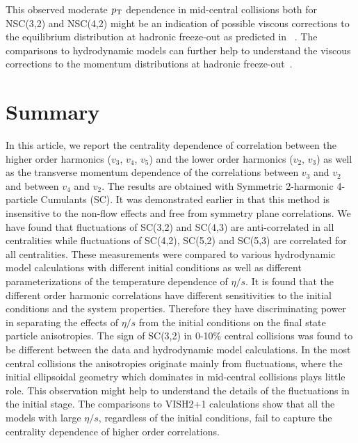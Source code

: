 This observed moderate $p_{\rm T}$ dependence in mid-central collisions both for NSC(3,2) and NSC(4,2) might be an indication of possible viscous corrections to the equilibrium distribution at hadronic freeze-out as predicted in ~\cite{Luzum:2010ad}.
The comparisons to hydrodynamic models can further help to understand the viscous corrections to the momentum distributions at hadronic freeze-out~\cite{Dusling:2009df,Teaney:2012ke,Molnar:2014fva,Niemi:2015qia}.


 
\section{Summary}
\label{sec:summary}
In this article, we report the centrality dependence of correlation between the higher order harmonics ($v_3$, $v_4$, $v_5$) and the lower order harmonics ($v_2$, $v_3$) as well as the transverse momentum dependence of the correlations between $v_3$ and $v_2$ and between $v_4$ and $v_2$.
The results are obtained with Symmetric 2-harmonic 4-particle Cumulants (SC). It was demonstrated earlier in \cite{ALICE:2016kpq} that this method is insensitive to the non-flow effects and free from symmetry plane correlations.
We have found that fluctuations of SC(3,2) and SC(4,3) are anti-correlated in all centralities while fluctuations of SC(4,2), SC(5,2) and SC(5,3) are correlated for all centralities. 
These measurements were compared to various hydrodynamic model calculations with different initial conditions as well as different parameterizations of the temperature dependence of $\eta/s$.
It is found that the different order harmonic correlations have different sensitivities to the initial conditions and the system properties. Therefore they have discriminating power in separating the effects of $\eta/s$  from the initial conditions on the final state particle anisotropies.
The sign of SC(3,2) in 0-10\% central collisions was found to be different between the data and hydrodynamic model calculations.
In the most central collisions the anisotropies originate mainly from fluctuations, where the initial ellipsoidal geometry which dominates in mid-central collisions plays little role. This observation might help to understand the details of the fluctuations in the initial stage. 
The comparisons to VISH2+1 calculations show that all the models with large $\eta/s$, regardless of the initial conditions, fail to capture the centrality dependence of higher order correlations. 

